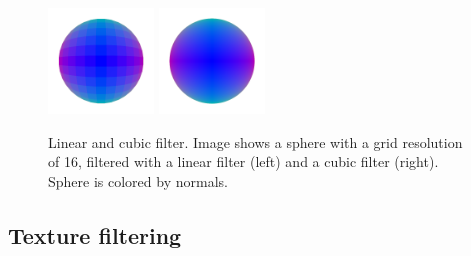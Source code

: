 \documentclass[12pt]{article}
\begin{document}
\begin{figure}[h]
	\centering
	\includegraphics[width=0.25\textwidth]{images/sphere16linear}
	\includegraphics[width=0.25\textwidth]{images/sphere16cubic}
	\caption{Linear and cubic filter. Image shows a sphere with a grid resolution of 16, filtered with a linear filter (left) and a cubic filter (right). Sphere is colored by normals.}
	\label{fig:linvscubnormal}
\end{figure}

\subsection{Texture filtering}
\end{document}
